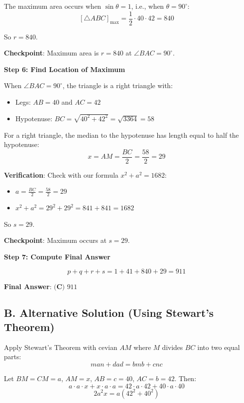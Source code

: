 \documentclass[12pt]{article}
\begin{document}
\begin{solutionbox}
The maximum area occurs when $\sin\theta = 1$, i.e., when $\theta = 90^{\circ}$:
$$[\triangle ABC]_{\max} = \frac{1}{2} \cdot 40 \cdot 42 = 840$$

So $r = 840$.

\textbf{Checkpoint}: Maximum area is $r = 840$ at $\angle BAC = 90^{\circ}$.

\vspace{0.3cm}

\textbf{Step 6: Find Location of Maximum}

When $\angle BAC = 90^{\circ}$, the triangle is a right triangle with:
\begin{itemize}
    \item Legs: $AB = 40$ and $AC = 42$
    \item Hypotenuse: $BC = \sqrt{40^2 + 42^2} = \sqrt{3364} = 58$
\end{itemize}

For a right triangle, the median to the hypotenuse has length equal to half the hypotenuse:
$$x = AM = \frac{BC}{2} = \frac{58}{2} = 29$$

\textbf{Verification}: Check with our formula $x^2 + a^2 = 1682$:
\begin{itemize}
    \item $a = \frac{BC}{2} = \frac{58}{2} = 29$
    \item $x^2 + a^2 = 29^2 + 29^2 = 841 + 841 = 1682$ \checkmark
\end{itemize}

So $s = 29$.

\textbf{Checkpoint}: Maximum occurs at $s = 29$.

\vspace{0.3cm}

\textbf{Step 7: Compute Final Answer}

$$p + q + r + s = 1 + 41 + 840 + 29 = 911$$

\textbf{Final Answer}: $\boxed{\textbf{(C) } 911}$

\subsection*{B. Alternative Solution (Using Stewart's Theorem)}

Apply Stewart's Theorem with cevian $AM$ where $M$ divides $BC$ into two equal parts:
$$man + dad = bmb + cnc$$

Let $BM = CM = a$, $AM = x$, $AB = c = 40$, $AC = b = 42$. Then:
$$a \cdot a \cdot x + x \cdot a \cdot a = 42 \cdot a \cdot 42 + 40 \cdot a \cdot 40$$
$$2a^2 x = a(42^2 + 40^2)$$


\end{solutionbox}
\end{document}
